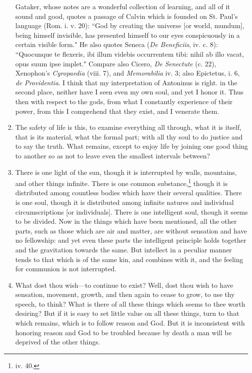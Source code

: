 \begin{enumerate}
{Gataker, whose notes are a wonderful collection of learning, and all of it sound and good, quotes a passage of Calvin which is founded on St. Paul's language (Rom. i. v. 20): ``God by creating the universe [{\clarify or world, mundum}], being himself invisible, has presented himself to our eyes conspicuously in a certain visible form." He also quotes Seneca (\textit{De Beneficiis}, iv. c. 8): ``Quocunque te flexeris, ibi illum videbis occurrentem tibi: nihil ab illo vacat, opus suum ipse implet." Compare also Cicero, \textit{De Senectute} (c. 22), Xenophon's \textit{Cyropaedia} (viii. 7), and \textit{Memorabilia} iv. 3; also Epictetus, i. 6, \textit{de Providentia}. I think that my interpretation of Antoninus is right.} in the second place, neither have I seen even my own soul, and yet I honor it. Thus then with respect to the gods, from what I constantly experience of their power, from this I comprehend that they exist, and I venerate them.

\item The safety of life is this, to examine everything all through, what it is itself, that is its material, what the formal part; with all thy soul to do justice and to say the truth. What remains, except to enjoy life by joining one good thing to another so as not to leave even the smallest intervals between?

\item There is one light of the sun, though it is interrupted by walls, mountains, and other things infinite. There is one common substance,\footnote{iv. 40.} though it is distributed among countless bodies which have their several qualities. There is one soul, though it is distributed among infinite natures and individual circumscriptions [{\clarify or individuals}]. There is one intelligent soul, though it seems to be divided. Now in the things which have been mentioned, all the other parts, such as those which are air and matter, are without sensation and have no fellowship: and yet even these parts the intelligent principle holds together and the gravitation towards the same. But intellect in a peculiar manner tends to that which is of the same kin, and combines with it, and the feeling for communion is not interrupted.

\item What dost thou wish—to continue to exist? Well, dost thou wish to have sensation, movement, growth, and then again to cease to grow, to use thy speech, to think? What is there of all these things which seems to thee worth desiring? But if it is easy to set little value on all these things, turn to that which remains, which is to follow reason and God. But it is inconsistent with honoring reason and God to be troubled because by death a man will be deprived of the other things.


\end{enumerate}
